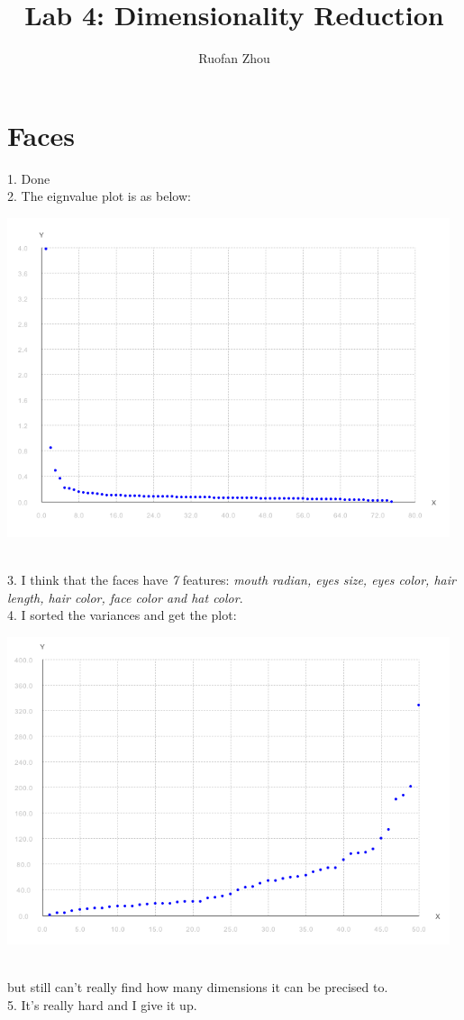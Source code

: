 \documentclass[11pt]{article} %
\title{Lab 4: Dimensionality Reduction}
\author{Ruofan Zhou}
\begin{document}
\maketitle

\section{Faces}
1. Done\\
2.  The eignvalue plot is as below:\\
\centerline{
\includegraphics[width=13cm]{pic/p4}}\\
3. I think that the faces have \emph{7} features: \emph{mouth radian, eyes size, eyes color, hair length, hair color, face color and hat color}.\\
4. I sorted the variances and get the plot: \\
\centerline{
\includegraphics[width=13cm]{pic/p2}}\\
but still can't really find how many dimensions it can be precised to.\\
5. It's really hard and I give it up.\\
\end{document}
